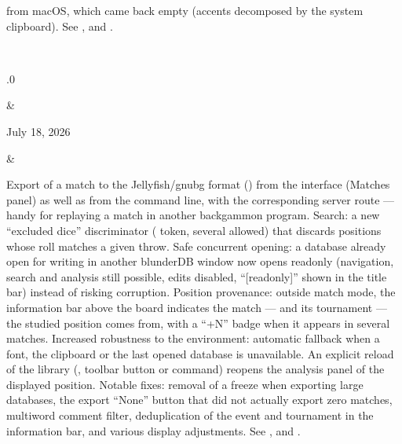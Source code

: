 \documentclass[letterpaper,10pt,english]{sphinxmanual}
\begin{document}
\begin{savenotes}
\begin{longtable}{}
\begin{varwidth}[t]{}
from macOS, which came back empty (accents decomposed by the system clipboard). See {\hyperref[\detokenize{mode_headless:headless}]{}}, {\hyperref[\detokenize{cmd_mode:cmd-mode}]{}} and {\hyperref[\detokenize{telecharge_install:telecharge-install}]{}}.
\sphinxbeforeendvarwidth
\end{varwidth}%
\\
\sphinxhline\begin{varwidth}[t]{}
.0
\sphinxbeforeendvarwidth
\end{varwidth}%
&\begin{varwidth}[t]{}
\sphinxAtStartPar
July 18, 2026
\sphinxbeforeendvarwidth
\end{varwidth}%
&\begin{varwidth}[t]{}
\sphinxAtStartPar
Export of a match to the Jellyfish/gnubg format () from the interface (Matches panel) as well as from the command line, with the corresponding server route — handy for replaying a match in another backgammon program. Search: a new “excluded dice” discriminator ( token, several allowed) that discards positions whose roll matches a given throw. Safe concurrent opening: a database already open for writing in another blunderDB window now opens read\sphinxhyphen{}only (navigation, search and analysis still possible, edits disabled, “{[}read\sphinxhyphen{}only{]}” shown in the title bar) instead of risking corruption. Position provenance: outside match mode, the information bar above the board indicates the match — and its tournament — the studied position comes from, with a “+N” badge when it appears in several matches. Increased robustness to the environment: automatic fallback when a font, the clipboard or the last opened database is unavailable. An explicit reload of the library (, toolbar button or  command) reopens the analysis panel of the displayed position. Notable fixes: removal of a freeze when exporting large databases, the export “None” button that did not actually export zero matches, multi\sphinxhyphen{}word comment filter, deduplication of the event and tournament in the information bar, and various display adjustments. See {\hyperref[\detokenize{cmd_mode:cmd-mode}]{}}, {\hyperref[\detokenize{manuel:panneau-matchs}]{}} and {\hyperref[\detokenize{manuel:manuel}]{}}.

\end{varwidth}
\end{longtable}
\end{savenotes}
\end{document}
